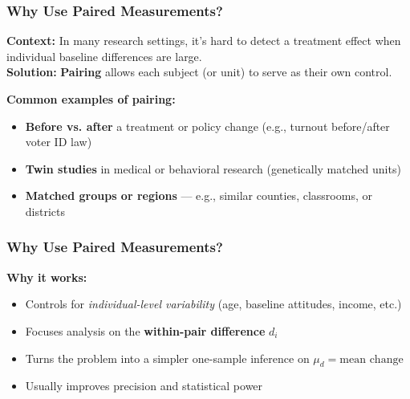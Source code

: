 \documentclass[handout]{beamer}
\begin{document}


\begin{frame}
\frametitle{Why Use Paired Measurements?}
\small
\vspace{-0.3em}
\textbf{Context:} In many research settings, it's hard to detect a treatment effect when individual baseline differences are large.
\\[0.6em]
\textbf{Solution:} \textbf{Pairing} allows each subject (or unit) to serve as their own control.

\vspace{1em}
\textbf{Common examples of pairing:}
\begin{itemize}
  \item \textbf{Before vs. after} a treatment or policy change (e.g., turnout before/after voter ID law)
  \item \textbf{Twin studies} in medical or behavioral research (genetically matched units)
  \item \textbf{Matched groups or regions} — e.g., similar counties, classrooms, or districts
\end{itemize}
\end{frame}

\begin{frame}
\frametitle{Why Use Paired Measurements?}
\textbf{Why it works:}
\begin{itemize}
  \item Controls for \textit{individual-level variability} (age, baseline attitudes, income, etc.)
  \item Focuses analysis on the \textbf{within-pair difference} \(d_i\)
  \item Turns the problem into a simpler one-sample inference on \(\mu_d = \text{mean change}\)
  \item Usually improves precision and statistical power
\end{itemize}
\end{frame}
\end{document}
